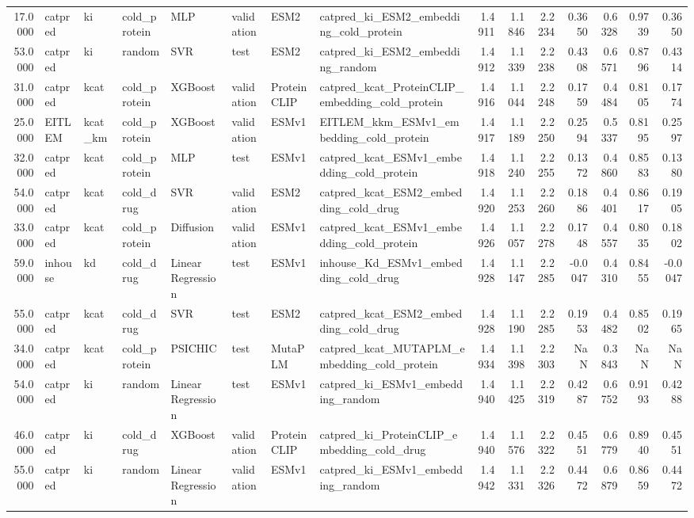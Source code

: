 \begin{tabular}{rlllllllrrrrrrr}
17.0000 & catpred & ki & cold_protein & MLP & validation & ESM2 & catpred_ki_ESM2_embedding_cold_protein & 1.4911 & 1.1846 & 2.2234 & 0.3650 & 0.6328 & 0.9739 & 0.3650 \\
53.0000 & catpred & ki & random & SVR & test & ESM2 & catpred_ki_ESM2_embedding_random & 1.4912 & 1.1339 & 2.2238 & 0.4308 & 0.6571 & 0.8796 & 0.4314 \\
31.0000 & catpred & kcat & cold_protein & XGBoost & validation & ProteinCLIP & catpred_kcat_ProteinCLIP_embedding_cold_protein & 1.4916 & 1.1044 & 2.2248 & 0.1759 & 0.4484 & 0.8105 & 0.1774 \\
25.0000 & EITLEM & kcat_km & cold_protein & XGBoost & validation & ESMv1 & EITLEM_kkm_ESMv1_embedding_cold_protein & 1.4917 & 1.1189 & 2.2250 & 0.2594 & 0.5337 & 0.8195 & 0.2597 \\
32.0000 & catpred & kcat & cold_protein & MLP & test & ESMv1 & catpred_kcat_ESMv1_embedding_cold_protein & 1.4918 & 1.1240 & 2.2255 & 0.1372 & 0.4860 & 0.8583 & 0.1380 \\
54.0000 & catpred & kcat & cold_drug & SVR & validation & ESM2 & catpred_kcat_ESM2_embedding_cold_drug & 1.4920 & 1.1253 & 2.2260 & 0.1886 & 0.4401 & 0.8617 & 0.1905 \\
33.0000 & catpred & kcat & cold_protein & Diffusion & validation & ESMv1 & catpred_kcat_ESMv1_embedding_cold_protein & 1.4926 & 1.1057 & 2.2278 & 0.1748 & 0.4557 & 0.8035 & 0.1802 \\
59.0000 & inhouse & kd & cold_drug & Linear Regression & test & ESMv1 & inhouse_Kd_ESMv1_embedding_cold_drug & 1.4928 & 1.1147 & 2.2285 & -0.0047 & 0.4310 & 0.8455 & -0.0047 \\
55.0000 & catpred & kcat & cold_drug & SVR & test & ESM2 & catpred_kcat_ESM2_embedding_cold_drug & 1.4928 & 1.1190 & 2.2285 & 0.1953 & 0.4482 & 0.8502 & 0.1965 \\
34.0000 & catpred & kcat & cold_protein & PSICHIC & test & MutaPLM & catpred_kcat_MUTAPLM_embedding_cold_protein & 1.4934 & 1.1398 & 2.2303 & NaN & 0.3843 & NaN & NaN \\
54.0000 & catpred & ki & random & Linear Regression & test & ESMv1 & catpred_ki_ESMv1_embedding_random & 1.4940 & 1.1425 & 2.2319 & 0.4287 & 0.6752 & 0.9193 & 0.4288 \\
46.0000 & catpred & ki & cold_drug & XGBoost & validation & ProteinCLIP & catpred_ki_ProteinCLIP_embedding_cold_drug & 1.4940 & 1.1576 & 2.2322 & 0.4551 & 0.6779 & 0.8940 & 0.4551 \\
55.0000 & catpred & ki & random & Linear Regression & validation & ESMv1 & catpred_ki_ESMv1_embedding_random & 1.4942 & 1.1331 & 2.2326 & 0.4472 & 0.6879 & 0.8659 & 0.4472 \\

\end{tabular}
